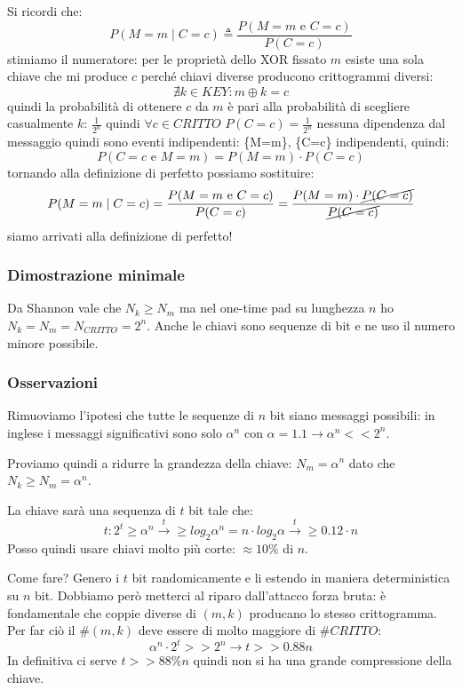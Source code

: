 Si ricordi che:
$$ P(M=m \mid C=c) \triangleq \frac{P(M=m\text{ e }C=c)}{P(C=c)} $$
stimiamo il numeratore: per le proprietà dello XOR fissato $m$ esiste una sola chiave che mi produce $c$ perché chiavi diverse producono crittogrammi diversi:
$$ \nexists k \in KEY: m \oplus k = c $$
quindi la probabilità di ottenere $c$ da $m$ è pari alla probabilità di scegliere casualmente $k$: $\frac{1}{2^n}$
quindi $\forall c \in CRITTO$ $P(C=c)=\frac{1}{2^n}$
nessuna dipendenza dal messaggio quindi sono eventi indipendenti: \{M=m\}, \{C=c\} indipendenti, quindi:
$$ P(C=c\text{ e }M=m) = P(M=m) \cdot P(C=c) $$
tornando alla definizione di perfetto possiamo sostituire:
$$
    P(M=m \mid C=c) = \frac{P(M=m\text{ e }C=c)}{P(C=c)} = \frac{P(M=m) \cdot \cancel{P(C=c)}}{\cancel{P(C=c)}}
$$
siamo arrivati alla definizione di perfetto!

\subsubsection{Dimostrazione minimale}
Da Shannon vale che $N_k \geq N_m$ ma nel one-time pad su lunghezza
$n$ ho $N_k = N_m= N_{CRITTO} = 2^n$.
Anche le chiavi sono sequenze di bit e ne uso il numero minore possibile.

\subsubsection{Osservazioni}
Rimuoviamo l'ipotesi che tutte le sequenze di $n$ bit siano messaggi possibili:
in inglese i messaggi significativi sono solo $\alpha^{n}$ con $\alpha = 1.1 \xrightarrow{} \alpha^n << 2^n$.

Proviamo quindi a ridurre la grandezza della chiave:
$N_m = \alpha^n$ dato che $N_k \geq N_m = \alpha^n$.

La chiave sarà una sequenza di $t$ bit tale che:
$$ t: 2^t \geq \alpha^n \xrightarrow t \geq log_2\alpha^n = n \cdot log_2\alpha \xrightarrow t \geq 0.12 \cdot n$$
Posso quindi usare chiavi molto più corte: $\approx 10\%$ di $n$.

Come fare? Genero i $t$ bit randomicamente e li estendo in maniera deterministica su $n$ bit.
Dobbiamo però metterci al riparo dall'attacco forza bruta: è fondamentale che coppie diverse di
$(m, k)$ producano lo stesso crittogramma. Per far ciò il $\#(m, k)$ deve essere di molto maggiore di $\#CRITTO$:
$$ \alpha^n \cdot 2^t >> 2^n \xrightarrow{} t >> 0.88n$$
In definitiva ci serve $t >> 88\%n$ quindi non si ha una grande compressione della chiave.